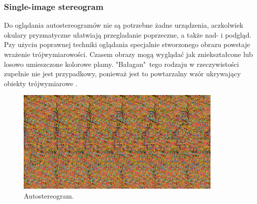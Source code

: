 \subsubsection{Single-image stereogram} 
Do oglądania autostereogramów nie są potrzebne żadne urządzenia, aczkolwiek okulary pryzmatyczne ułatwiają przegladanie poprzeczne, a także nad- i podgląd.\\
Pzy użyciu poprawnej techniki oglądania specjalnie stworzonego obrazu powstaje wrażenie trójwymiarowości. Czasem obrazy mogą wyglądać jak zniekształcone lub losowo umieszczone kolorowe plamy. "Bałagan"\ tego rodzaju w rzeczywistości zupełnie nie jest przypadkowy, ponieważ jest to powtarzalny wzór ukrywający obiekty trójwymiarowe \cite{stereoscopythesis}.
\begin{figure}[H]
		\centering
 		\includegraphics[width=10cm]{autostereogram.png}
    	\caption{Autostereogram.}
 		\label{rys1}
\end{figure}

